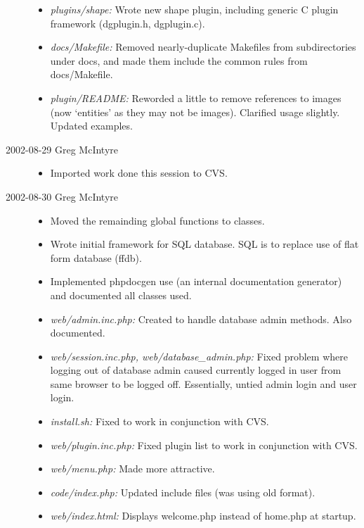 \documentclass{article}
\begin{document}
\begin{description}
\begin{itemize}

\item \textit{plugins/shape:} Wrote new shape plugin, including generic C plugin framework (dgplugin.h, dgplugin.c).
\item \textit{docs/Makefile:} Removed nearly-duplicate Makefiles from subdirectories under docs, and made them include the common rules from docs/Makefile.
\item \textit{plugin/README:} Reworded a little to remove references to images (now `entities' as they may not be images). Clarified usage slightly. Updated examples.

\end{itemize}

\item[2002-08-29 Greg McIntyre]\hspace{0em}

\begin{itemize}

\item Imported work done this session to CVS.

\end{itemize}

\item[2002-08-30 Greg McIntyre]\hspace{0em}

\begin{itemize}

\item Moved the remainding global functions to classes.
\item Wrote initial framework for SQL database. SQL is to replace use of flat form database (ffdb). 
\item Implemented phpdocgen use (an internal documentation generator) and documented all classes used. 
\item \textit{web/admin.inc.php:} Created to handle database admin methods. Also documented.
\item \textit{web/session.inc.php, web/database\_admin.php:} Fixed problem where logging out of database admin caused currently logged in user from same browser to be logged off. Essentially, untied admin login and user login.
\item \textit{install.sh:} Fixed to work in conjunction with CVS.
\item \textit{web/plugin.inc.php:} Fixed plugin list to work in conjunction with CVS.
\item \textit{web/menu.php:} Made more attractive.
\item \textit{code/index.php:} Updated include files (was using old format).
\item \textit{web/index.html:} Displays welcome.php instead of home.php at startup.


\end{itemize}
\end{description}
\end{document}
